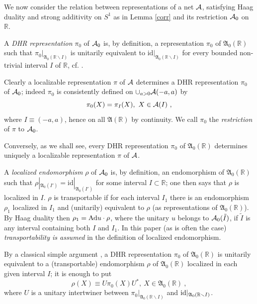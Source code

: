\documentclass[12pt]{article}
\def\setminus{\smallsetminus}
\def\A{{\cal A}}
\begin{document}
We now consider the relation between representations of a net $\A$,
satisfying Haag duality and strong additivity on $S^1$ as in Lemma \ref{corr}
and its restriction $\A_0$ on $\mathbb R$.

A {\it DHR representation} $\pi_0$ of $\A_0$ is, by definition, a
representation $\pi_0$ of $\mathfrak A_0(\mathbb R)$ such that
$\pi_0|_{\mathfrak A_0(\mathbb R\setminus I)}$ is unitarily
equivalent to $\text{id}|_{\mathfrak A_0(\mathbb R\setminus I)}$
for every bounded non-trivial interval $I$ of $\mathbb R$, cf. 
\cite{DHR}.

Clearly a localizable representation $\pi$ of $\A$ determines a DHR 
representation $\pi_0$ of $\A_0$; indeed $\pi_0$ is consistently 
defined on $\cup_{a>0}\A(-a,a)$ by
\[
\pi_0(X)=\pi_I(X),\ X\in\A(I)\ ,
\]
where $I\equiv (-a,a)$, hence on all $\mathfrak A(\mathbb R)$ 
by continuity. We call $\pi_0$ the {\it restriction} of $\pi$ to $\A_0$.

Conversely, as we shall see,
every DHR representation  $\pi_0$ of $\mathfrak A_0(\mathbb R)$
determines uniquely a localizable representation $\pi$ of $\A$.

A {\it localized endomorphism} $\rho$ of $\A_0$ is, by definition, an 
endomorphism of $\mathfrak A_0(\mathbb R)$ such that $\rho|_{\mathfrak 
A_0(I')}=\text{id}|_{\mathfrak A_0(I')}$ for some interval 
$I\subset\mathbb R$; one then says that $\rho$ is localized in $I$.  
$\rho$ is transportable if for each interval $I_1$ there is an 
endomorphism $\rho_1$ localized in $I_1$ and (unitarily) equivalent to 
$\rho$ (as representations of $\mathfrak A_0(\mathbb R)$).  By Haag 
duality then $\rho_1 = {\rm Ad}u\cdot\rho$, where the unitary $u$ 
belongs to $\A_0(\tilde I)$, if $\tilde I$ is any interval containing 
both $I$ and $I_1$.  In this paper (as is often the case) {\it 
transportability is assumed} in the definition of localized 
endomorphism.

By a classical simple argument \cite{DHR}, a DHR representation 
$\pi_0$ of 
$\mathfrak A_0(\mathbb R)$ is unitarily
equivalent to a (transportable) endomorphism $\rho$ of 
$\mathfrak A_0(\mathbb R)$ localized in each given interval $I$; 
it is enough to put
\[
\rho(X)\equiv U\pi_0(X)U^*, \ X\in\mathfrak A_0(\mathbb R)\ ,
\]
where $U$ is a unitary intertwiner between 
$\pi_0|_{\mathfrak A_0(\mathbb R\setminus I)}$ and
${\rm id}|_{\mathfrak A_0(\mathbb R\setminus I)}$.
\end{document}
